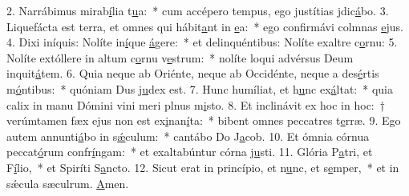 2. Narrábimus mirab\uline{í}lia t\uline{u}a:~* cum accépero tempus, ego justítias jdic\uline{á}bo.
3. Liquefácta est terra, et omnes qui hábit\uline{a}nt in \uline{e}a:~* ego confirmávi colmnas \uline{e}jus.
4. Dixi iníquis: Nolíte in\uline{í}que \uline{á}gere:~* et delinquéntibus: Nolíte exaltre c\uline{o}rnu:
5. Nolíte extóllere in altum c\uline{o}rnu v\uline{e}strum:~* nolíte loqui advérsus Deum inquit\uline{á}tem.
6. Quia neque ab Oriénte, neque ab Occidénte, neque a des\uline{é}rtis m\uline{ó}ntibus:~* quóniam Dus j\uline{u}dex est.
7. Hunc humíliat, et h\uline{u}nc ex\uline{á}ltat:~* quia calix in manu Dómini vini meri plnus m\uline{i}sto.
8. Et inclinávit ex hoc in hoc:~† verúmtamen fæx ejus non est ex\uline{i}nan\uline{í}ta:~* bibent omnes peccatres t\uline{e}rræ.
9. Ego autem annunti\uline{á}bo in s\uline{ǽ}culum:~* cantábo Do J\uline{a}cob.
10. Et ómnia córnua peccat\uline{ó}rum confr\uline{í}ngam:~* et exaltabúntur córna j\uline{u}sti.
11. Glória P\uline{a}tri, et F\uline{í}lio,~* et Spiríti S\uline{a}ncto.
12. Sicut erat in princípio, et n\uline{u}nc, et s\uline{e}mper,~* et in sǽcula sæculrum. \uline{A}men.
